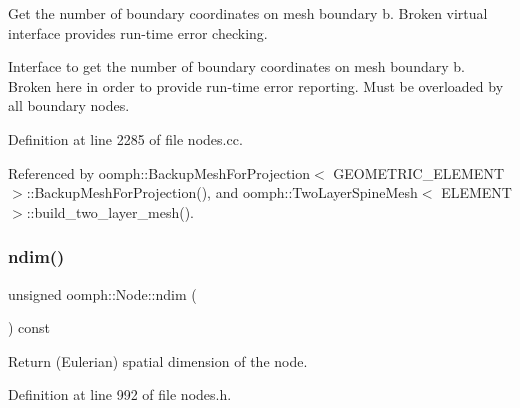 Get the number of boundary coordinates on mesh boundary b. Broken virtual interface provides run-\/time error checking. 

Interface to get the number of boundary coordinates on mesh boundary b. Broken here in order to provide run-\/time error reporting. Must be overloaded by all boundary nodes. 

Definition at line 2285 of file nodes.\+cc.



Referenced by oomph\+::\+Backup\+Mesh\+For\+Projection$<$ G\+E\+O\+M\+E\+T\+R\+I\+C\+\_\+\+E\+L\+E\+M\+E\+N\+T $>$\+::\+Backup\+Mesh\+For\+Projection(), and oomph\+::\+Two\+Layer\+Spine\+Mesh$<$ E\+L\+E\+M\+E\+N\+T $>$\+::build\+\_\+two\+\_\+layer\+\_\+mesh().

\mbox{\label{classoomph_1_1Node_a786c96a8e46eb27a03b2b31f629d41b3}} 
\subsubsection{\texorpdfstring{ndim()}{ndim()}}
{\footnotesize\ttfamily unsigned oomph\+::\+Node\+::ndim (\begin{DoxyParamCaption}{ }\end{DoxyParamCaption}) const\hspace{0.3cm}{\ttfamily [inline]}}



Return (Eulerian) spatial dimension of the node. 



Definition at line 992 of file nodes.\+h.



